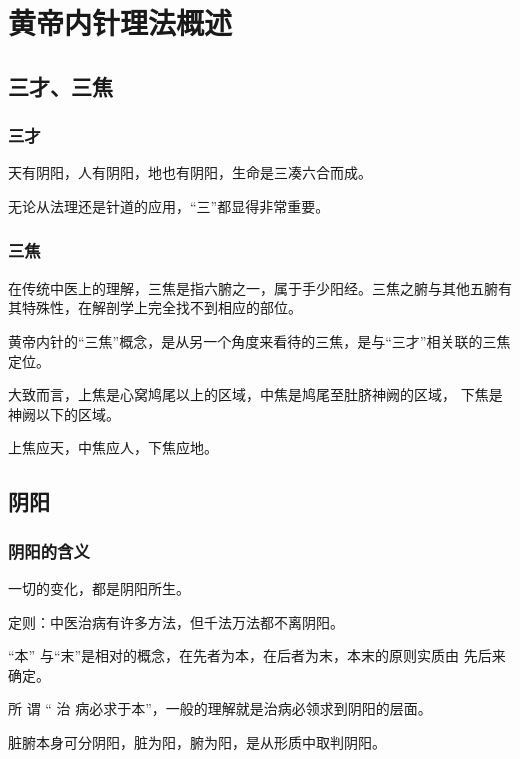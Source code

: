 \documentclass[
]{book}
\begin{document}
\chapter{黄帝内针理法概述}\label{ux9ec4ux5e1dux5185ux9488ux7406ux6cd5ux6982ux8ff0}

\section{三才、三焦}\label{ux4e09ux624dux4e09ux7126}

\subsection{三才}\label{ux4e09ux624d}

天有阴阳，人有阴阳，地也有阴阳，生命是三凑六合而成。

无论从法理还是针道的应用，``三''都显得非常重要。

\subsection{三焦}\label{ux4e09ux7126}

在传统中医上的理解，三焦是指六腑之一，属于手少阳经。三焦之腑与其他五腑有其特殊性，在解剖学上完全找不到相应的部位。

黄帝内针的``三焦''概念，是从另一个角度来看待的三焦，是与``三才''相关联的三焦定位。

大致而言，上焦是心窝鸠尾以上的区域，中焦是鸠尾至肚脐神阙的区域， 下焦是神阙以下的区域。

上焦应天，中焦应人，下焦应地。

\section{阴阳}\label{ux9634ux9633}

\subsection{阴阳的含义}\label{ux9634ux9633ux7684ux542bux4e49}

一切的变化，都是阴阳所生。

定则：中医治病有许多方法，但千法万法都不离阴阳。

``本'' 与``末''是相对的概念，在先者为本，在后者为末，本末的原则实质由 先后来确定。

所 谓 `` 治 病必求于本''，一般的理解就是治病必领求到阴阳的层面。

脏腑本身可分阴阳，脏为阳，腑为阳，是从形质中取判阴阳。
\end{document}
